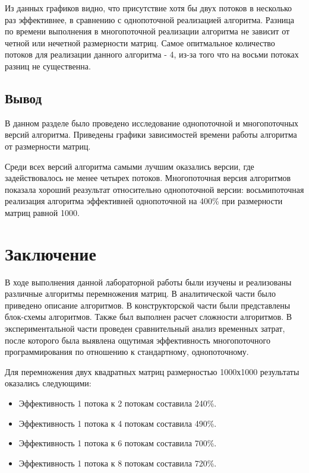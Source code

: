 \documentclass[12pt, a4paper]{report}
\begin{document}
	Из данных графиков видно, что присутствие хотя бы двух потоков в несколько раз эффективнее, в сравнению с однопоточной реализацией алгоритма. Разница по времени выполнения в многопоточной реализации алгоритма не зависит от четной или нечетной размерности матриц. Самое опитмальное количество потоков для реализации данного алгоритма - 4, из-за того что на восьми потоках разниц не существенна. 
	\newpage
	
	\section{Вывод}
	
	\hspace{0.6cm}В данном разделе было проведено исследование однопоточной и многопоточных версий алгоритма. Приведены графики зависимостей времени работы алгоритма от размерности матриц.
	
	\vspace{0.3cm}Среди всех версий алгоритма самыми лучшим оказались версии, где задействовалось не менее четырех потоков. Многопоточная версия алгоритмов показала хороший реазультат относительно однопоточной версии: восьмипоточная реализация алгоритма эффективней однопоточной на 400\% при размерности матриц равной 1000.

	\newpage

	\chapter{Заключение}
		\vspace{-0.6cm}\hspace{0.5cm}В ходе выполнения данной лабораторной работы были изучены и реализованы различные алгоритмы перемножения матриц. В аналитической части было приведено описание алгоритмов. В конструкторской части были представлены блок-схемы алгоритмов. Также был выполнен расчет сложности алгоритмов. В экспериментальной части проведен сравнительный анализ временных затрат, после которого была выявлена ощутимая эффективность многопоточного программирования по отношению к стандартному, однопоточному. 
		
		\vspace{0.3cm}Для перемножения двух квадратных матриц размерностью 1000х1000 результаты оказались следующими:
	\begin{itemize} 
		\item Эффективность 1 потока к 2 потокам составила 240\%.
		\item Эффективность 1 потока к 4 потокам составила 490\%.
		\item Эффективность 1 потока к 6 потокам составила 700\%.
		\item Эффективность 1 потока к 8 потокам составила 720\%.
	\end{itemize}
	
\end{document}
